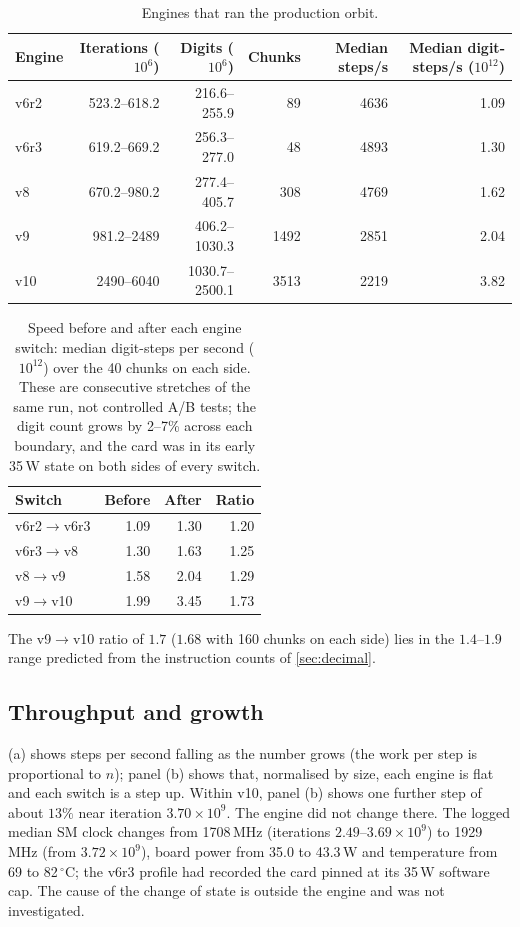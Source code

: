 \documentclass[11pt,a4paper]{article}
\theoremstyle{remark}
\begin{document}
\begin{table}[t]
\centering\small
\setlength{\tabcolsep}{4.5pt}
\caption{Engines that ran the production orbit.}\label{tab:engines}
\begin{tabular}{@{}lrrrrr@{}}
\toprule
Engine & Iterations ($10^6$) & Digits ($10^6$) & Chunks & Median steps/s & Median digit-steps/s ($10^{12}$)\\
\midrule
v6r2 & 523.2--618.2 & 216.6--255.9 & 89 & \num{4636} & 1.09\\
v6r3 & 619.2--669.2 & 256.3--277.0 & 48 & \num{4893} & 1.30\\
v8 & 670.2--980.2 & 277.4--405.7 & 308 & \num{4769} & 1.62\\
v9 & 981.2--2489 & 406.2--1030.3 & 1492 & \num{2851} & 2.04\\
v10 & 2490--6040 & 1030.7--2500.1 & 3513 & \num{2219} & 3.82\\
\bottomrule
\end{tabular}
\end{table}

\begin{table}[t]
\centering\small
\caption{Speed before and after each engine switch: median digit-steps per second ($10^{12}$) over the 40 chunks on each side. These are consecutive stretches of the same run, not controlled A/B tests; the digit count grows by 2--7\% across each boundary, and the card was in its early 35\,W state on both sides of every switch.}\label{tab:boundary}
\begin{tabular}{@{}lrrr@{}}
\toprule
Switch & Before & After & Ratio\\
\midrule
v6r2$\to$v6r3 & 1.09 & 1.30 & 1.20\\
v6r3$\to$v8 & 1.30 & 1.63 & 1.25\\
v8$\to$v9 & 1.58 & 2.04 & 1.29\\
v9$\to$v10 & 1.99 & 3.45 & 1.73\\
\bottomrule
\end{tabular}
\end{table}

The v9$\to$v10 ratio of $1.7$ ($1.68$ with 160 chunks on each side) lies in the $1.4$--$1.9$ range predicted from the instruction counts of \cref{sec:decimal}.

\subsection{Throughput and growth}

(a) shows steps per second falling as the number grows (the work per step is proportional to $n$); panel (b) shows that, normalised by size, each engine is flat and each switch is a step up. Within v10, panel (b) shows one further step of about $13\%$ near iteration $3.70\times10^9$. The engine did not change there. The logged median SM clock changes from \num{1708}\,MHz (iterations $2.49$--$3.69\times10^9$) to \num{1929}\,MHz (from $3.72\times10^9$), board power from 35.0 to 43.3\,W and temperature from 69 to 82\,$^\circ$C; the v6r3 profile had recorded the card pinned at its 35\,W software cap. The cause of the change of state is outside the engine and was not investigated.
\end{document}
